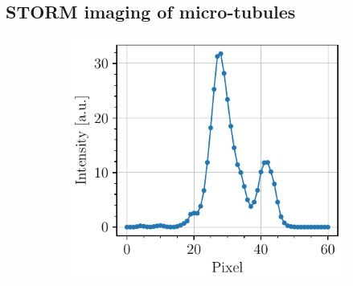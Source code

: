 \subsection{STORM imaging of micro-tubules}
\begin{figure}[htbp]
    \begin{subfigure}[b]{0.49\textwidth}    %
        \centering
        \caption{}
        \label{fig:microtubules_width_acquisition}
    \end{subfigure}
    \begin{subfigure}[b]{0.49\textwidth}
        \centering
        \includegraphics[scale=1]{figures/microtubules_width.pdf}

\end{subfigure}
\end{figure}
